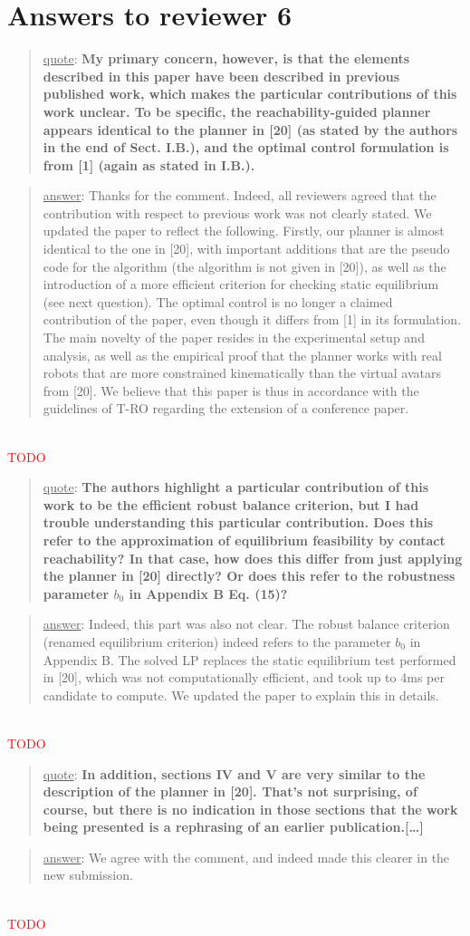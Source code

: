 \documentclass[a4paper]{article}
\newcommand{\ndone}[0]{\textcolor{red}{TODO}}
\newcommand\quot[1]{\begin{quote} \underline{quote}: \textbf{#1}\end{quote}}
\newcommand\as[1]{\begin{quote} \underline{answer}: {#1}\end{quote} \leavevmode \\ }
\begin{document}
\section{Answers to reviewer 6}
\quot{ My primary concern, however,
is that the elements described in this paper have been described in
previous published work, which makes the particular contributions of
this work unclear. To be specific, the reachability-guided planner
appears identical to the planner in [20] (as stated by the authors in
the end of Sect. I.B.), and the optimal control formulation is from [1]
(again as stated in I.B.).}
\as{Thanks for the comment. Indeed, all reviewers agreed that the contribution with respect to previous work was not clearly stated. We updated the paper to reflect the following. Firstly, our planner is almost identical to the one in [20], with important additions that are the pseudo code for the algorithm (the algorithm is not given in [20]), as well as the introduction of a more efficient criterion
for checking static equilibrium (see next question). The optimal control is no longer a claimed contribution of the paper, even though it differs from [1] in its formulation. The main
novelty of the paper resides in the experimental setup and analysis, as well as the empirical proof that the planner works with real robots that are more constrained kinematically than the virtual avatars from [20]. We believe that this paper is thus in accordance with the guidelines of T-RO regarding the extension of a conference paper.}\ndone

\quot{The authors highlight a particular
contribution of this work to be the efficient robust balance criterion,
but I had trouble understanding this particular contribution. Does this
refer to the approximation of equilibrium feasibility by contact
reachability? In that case, how does this differ from just applying the
planner in [20] directly? Or does this refer to the robustness
parameter $b_0$ in Appendix B Eq. (15)?}
\as{Indeed, this part was also not clear. The robust balance criterion (renamed equilibrium criterion) indeed refers to the parameter $b_0$ in Appendix B. The solved
LP replaces the static equilibrium test performed in [20], which was not computationally efficient, and took up to 4ms per candidate to compute. We updated the paper to explain
this in details.}\ndone

\quot{In addition, sections IV and V are very similar to the description of
the planner in [20]. That's not surprising, of course, but there is no
indication in those sections that the work being presented is a
rephrasing of an earlier publication.[\dots] }
\as{We agree with the comment, and indeed made this clearer in the new submission.}\ndone
\end{document}
